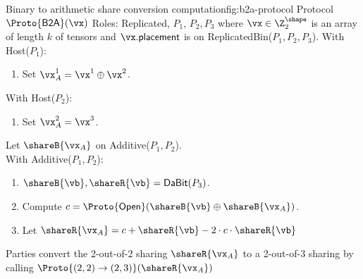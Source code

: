 \begin{Boxfig}{Binary to arithmetic share conversion computation}{fig:b2a-protocol}
  {Protocol $\Proto{\mathsf{B2A}}(\vx)$}
  Roles: Replicated, $P_1$, $P_2, P_3$ where $\vx \in \Z_{2}^\shape$ is an array of length $k$
  of tensors and
  $\vx.\mathsf{placement}$ is on ReplicatedBin($P_1, P_2, P_3$). \newline
  With Host($P_1$):
  \begin{enumerate}
  \item Set $\vx_A^1 = \vx^1 \oplus \vx^2$.
  \end{enumerate}
  With Host($P_2$):
  \begin{enumerate}
      \item Set $\vx_A^2 = \vx^3$.
  \end{enumerate}
  Let $\shareB{\vx_A}$ on Additive($P_1, P_2$). \\
  With Additive($P_1, P_2$):
  \begin{enumerate}
      \item $\shareB{\vb}, \shareR{\vb} = \textsf{DaBit}(P_3)$.
      \item Compute $c = \Proto{\mathsf{Open}}( \shareB{\vb} \oplus \shareB{\vx_A})$.
      \item Let $\shareR{\vx_A} = c + \shareR{\vb} - 2 \cdot c \cdot \shareR{\vb}$
  \end{enumerate}
  Parties convert the 2-out-of-2 sharing $\shareR{\vx_A}$ to a 2-out-of-3 sharing by calling
  $\Proto{ (2,2)\rightarrow (2,3)}(\shareR{\vx_A})$

\end{Boxfig}

